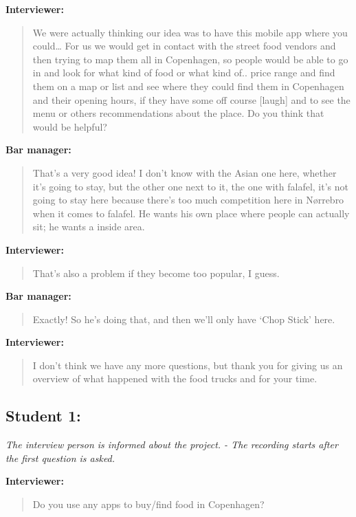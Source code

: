 \textbf{Interviewer:}
\begin{quotation}
    We were actually thinking our idea was to have this mobile app where you could… For us we would get in contact with the street food vendors and then trying to map them all in Copenhagen, so people would be able to go in and look for what kind of food or what kind of.. price range and find them on a map or list and see where they could find them in Copenhagen and their opening hours, if they have some off course [laugh] and to see the menu or others recommendations about the place. Do you think that would be helpful?
\end{quotation}

\textbf{Bar manager:}
\begin{quotation}
 That’s a very good idea! I don’t know with the Asian one here, whether it’s going to stay, but the other one next to it, the one with falafel, it's not going to stay here because there's too much competition here in Nørrebro when it comes to falafel. He wants his own place where people can actually sit; he wants a inside area.
\end{quotation}

\textbf{Interviewer:}
\begin{quotation}
 That's also a problem if they become too popular, I guess.
\end{quotation}

\textbf{Bar manager:}
\begin{quotation}
    Exactly! So he's doing that, and then we'll only have ‘Chop Stick’ here.
\end{quotation}

\textbf{Interviewer:}
\begin{quotation}
    I don’t think we have any more questions, but thank you for giving us an overview of what happened with the food trucks and for your time.
\end{quotation}


\subsection{Student 1:}

\textit{The interview person is informed about the project. - The recording starts after the first question is asked.}

\textbf{Interviewer:}
\begin{quotation}
    Do you use any apps to buy/find food in Copenhagen?
\end{quotation}

